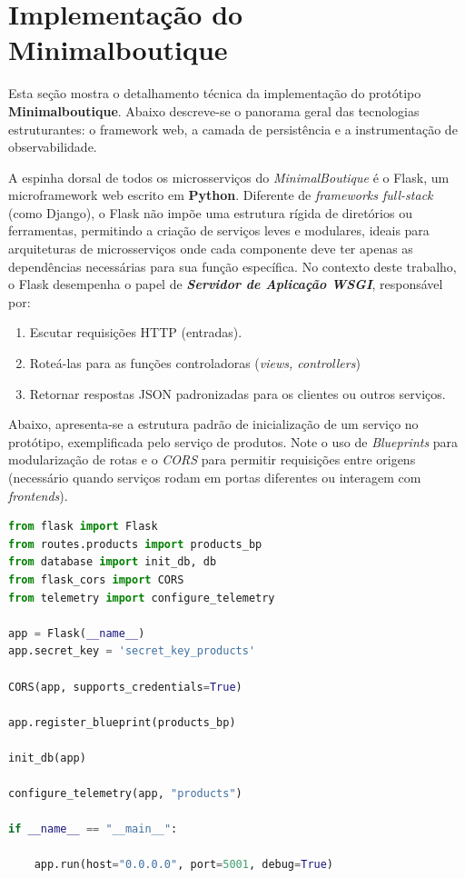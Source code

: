 \section{Implementação do Minimalboutique}
Esta seção mostra o detalhamento técnica da implementação do protótipo \textbf{Minimalboutique}. Abaixo descreve-se o panorama geral das tecnologias estruturantes: o framework web, a camada de persistência e a instrumentação de observabilidade.


A espinha dorsal de todos os microsserviços do \textit{MinimalBoutique} é o Flask, um microframework web escrito em \textbf{Python}. Diferente de \textit{frameworks full-stack} (como Django), o Flask não impõe uma estrutura rígida de diretórios ou ferramentas, permitindo a criação de serviços leves e modulares, ideais para arquiteturas de microsserviços onde cada componente deve ter apenas as dependências necessárias para sua função específica.
No contexto deste trabalho, o Flask desempenha o papel de \textbf{\textit{Servidor de Aplicação WSGI}}, responsável por:
\begin{enumerate}
    \item Escutar requisições HTTP (entradas).
    \item Roteá-las para as funções controladoras (\textit{views, controllers})
    \item Retornar respostas JSON padronizadas para os clientes ou outros serviços.
\end{enumerate}
Abaixo, apresenta-se a estrutura padrão de inicialização de um serviço no protótipo, exemplificada pelo serviço de produtos. Note o uso de \textit{Blueprints} para modularização de rotas e o \textit{CORS} para permitir requisições entre origens (necessário quando serviços rodam em portas diferentes ou interagem com \textit{frontends}).

\begin{lstlisting}[language=Python, caption={Inicialização de um Serviço (produtos) com Flask}, label={lst:pyex}]
from flask import Flask
from routes.products import products_bp
from database import init_db, db
from flask_cors import CORS
from telemetry import configure_telemetry

app = Flask(__name__)
app.secret_key = 'secret_key_products'

CORS(app, supports_credentials=True)

app.register_blueprint(products_bp)

init_db(app)

configure_telemetry(app, "products")

if __name__ == "__main__":

    app.run(host="0.0.0.0", port=5001, debug=True)
\end{lstlisting}

